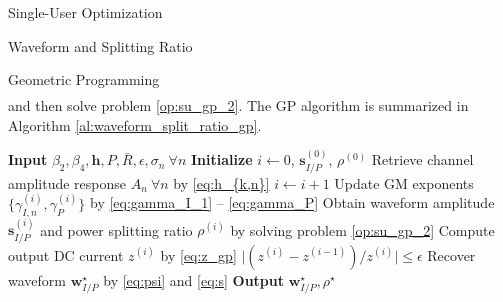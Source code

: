 \documentclass{IEEEtran}
\begin{document}
\begin{section}{Single-User Optimization}
\begin{subsection}{Waveform and Splitting Ratio}
\begin{subsubsection}{Geometric Programming}
\begin{align}
			\end{align}
			and then solve problem \ref{op:su_gp_2}. The GP algorithm is summarized in Algorithm \ref{al:waveform_split_ratio_gp}.
			\begin{algorithm}
				\caption{GP: Waveform and Splitting Ratio}
				\label{al:waveform_split_ratio_gp}
				\begin{algorithmic}[1]
					\State \textbf{Input} $\beta_2,\beta_4,\boldsymbol{h},P,\bar{R},\epsilon,\sigma_n \ \forall n$
					\State \textbf{Initialize} $i \gets 0$, $\boldsymbol{s}_{I/P}^{(0)}$, $\rho^{(0)}$
					\State Retrieve channel amplitude response $A_n \ \forall n$ by \ref{eq:h_{k,n}}
					\Repeat
					\State $i \gets i + 1$
					\State Update GM exponents $\{\gamma_{I,n}^{(i)},\gamma_{P}^{(i)}\}$ by \ref{eq:gamma_I_1} -- \ref{eq:gamma_P}
					\State Obtain waveform amplitude $\boldsymbol{s}_{I/P}^{(i)}$ and power splitting ratio $\rho^{(i)}$ by solving problem \ref{op:su_gp_2}
					\State Compute output DC current $z^{(i)}$ by \ref{eq:z_gp}
					\Until $\lvert (z^{(i)} - z^{(i-1)}) / z^{(i)} \rvert \le \epsilon$
					\State Recover waveform $\boldsymbol{w}_{I/P}^{\star}$ by \ref{eq:psi} and \ref{eq:s}
					\State \textbf{Output} $\boldsymbol{w}_{I/P}^{\star}, \rho^{\star}$
				\end{algorithmic}
			\end{algorithm}
		\end{subsubsection}


\end{subsection}
\end{section}
\end{document}

